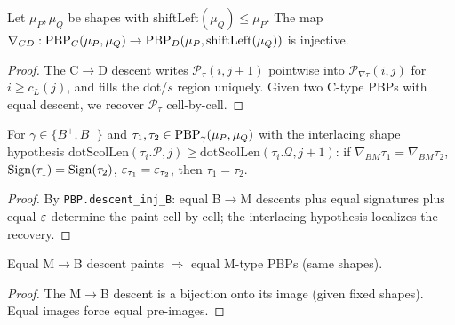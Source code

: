 \begin{lemma}
  \label{lem:10_4_C}
  \leanok
  Let $\mu_P, \mu_Q$ be shapes with $\mathrm{shiftLeft}(\mu_Q) \leq \mu_P$.
  The map $\nabla_{CD} : \mathrm{PBP}_C(\mu_P, \mu_Q) \to \mathrm{PBP}_D(\mu_P, \mathrm{shiftLeft}(\mu_Q))$ is injective.
\end{lemma}
\begin{proof}
  \leanok
  The C$\to$D descent writes $\mathcal{P}_\tau(i, j + 1)$ pointwise into $\mathcal{P}_{\nabla\tau}(i, j)$ for $i \geq c_L(j)$, and fills the dot/$s$ region uniquely. Given two C-type PBPs with equal descent, we recover $\mathcal{P}_\tau$ cell-by-cell.
\end{proof}


\begin{lemma}
  \label{lem:10_4_B}
  \leanok
  For $\gamma \in \{B^+, B^-\}$ and $\tau_1, \tau_2 \in \mathrm{PBP}_\gamma(\mu_P, \mu_Q)$
  with the interlacing shape hypothesis $\mathrm{dotScolLen}(\tau_i.\mathcal{P}, j) \geq \mathrm{dotScolLen}(\tau_i.\mathcal{Q}, j + 1)$:
  if $\nabla_{BM}\tau_1 = \nabla_{BM}\tau_2$, $\mathrm{Sign}(\tau_1) = \mathrm{Sign}(\tau_2)$, $\varepsilon_{\tau_1} = \varepsilon_{\tau_2}$,
  then $\tau_1 = \tau_2$.
\end{lemma}
\begin{proof}
  \leanok
  By \texttt{PBP.descent\_inj\_B}: equal B$\to$M descents plus equal signatures plus equal $\varepsilon$ determine the paint cell-by-cell; the interlacing hypothesis localizes the recovery.
\end{proof}


\begin{lemma}
  \label{lem:10_5_M}
  \leanok
  Equal M$\to$B descent paints $\Rightarrow$ equal M-type PBPs (same shapes).
\end{lemma}
\begin{proof}
  \leanok
  The M$\to$B descent is a bijection onto its image (given fixed shapes). Equal images force equal pre-images.
\end{proof}


